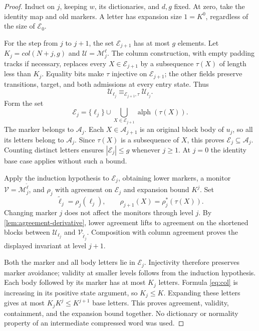 \begin{proof}
Induct on $j$, keeping $w$, its dictionaries, and $d,g$ fixed. At zero,
take the identity map and old markers. A letter has expansion size
$1=K^0$, regardless of the size of $\mathcal E_0$.

For the step from $j$ to $j+1$, the set $\mathcal E_{j+1}$ has at most $g$ elements.
Let $K_j=\mathit{col}(N+j,g)$ and
$\mathcal U=\mathcal M^{\boldsymbol\ell}_j$.
The column construction, with empty padding tracks if necessary,
replaces every $X\in \mathcal E_{j+1}$ by a subsequence $\tau(X)$ of length less
than $K_j$. Equality bits make $\tau$ injective on $\mathcal E_{j+1}$; the other fields
preserve transitions, target, and both admissions at every entry state.
Thus
\[
 \mathcal U_{\ell_j}\equiv_{\mathcal E_{j+1},\tau}\mathcal U_{\ell_j}.
\]
Form the set
\[
 \mathcal E_j = \{\ell_j\}\cup\bigcup_{X\in \mathcal E_{j+1}}\operatorname{alph}(\tau(X)).
\]
The marker belongs to $\mathcal A_j$. Each $X\in\mathcal A_{j+1}$
is an original block body of $u_j$, so all its letters belong to
$\mathcal A_j$. Since $\tau(X)$ is a subsequence of $X$, this proves
$\mathcal E_j\subseteq\mathcal A_j$. Counting distinct letters ensures
$|\mathcal E_j|\le g$ whenever $j\ge1$. At $j=0$ the
identity base case applies without such a bound.

Apply the induction hypothesis to $\mathcal E_j$, obtaining lower markers,
a monitor $\mathcal V=\mathcal M^{\widetilde{\boldsymbol\ell}}_j$,
and $\rho_j$ with agreement on $\mathcal E_j$ and expansion bound $K^j$.
Set
\[
 \widetilde\ell_j=\rho_j(\ell_j),\qquad
 \rho_{j+1}(X)=\rho_j^*(\tau(X)).
\]
Changing marker $j$ does not affect the monitors through level $j$.
By \cref{lem:agreement-derivative}, lower agreement lifts to agreement
on the shortened blocks between $\mathcal U_{\ell_j}$ and
$\mathcal V_{\widetilde\ell_j}$. Composition with column agreement
proves the displayed invariant at level $j+1$.

Both the marker and all body letters lie in $\mathcal E_j$. Injectivity therefore
preserves marker avoidance; validity at smaller levels follows from the
induction hypothesis. Each body followed by its marker has at most
$K_j$ letters. Formula \eqref{eq:col} is increasing in its positive state
argument, so $K_j\le K$. Expanding these letters gives at most
$K_jK^j\le K^{j+1}$ base letters. This proves agreement, validity,
containment, and the expansion bound together. No dictionary or normality
property of an intermediate compressed word was used.
\end{proof}

